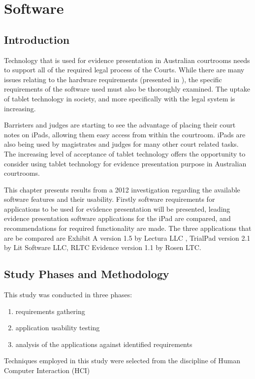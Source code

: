 


\chapter{Software\label{chap:Software}}


\section{Introduction}
\doublespace
Technology that is used for evidence presentation in Australian courtrooms needs to support all of the required legal process of the Courts. While there are many issues relating to the hardware requirements (presented in 
 ), the specific requirements of the software used must also be thoroughly examined. The uptake of tablet technology in society, and more specifically with the legal system is increasing.

Barristers and judges are starting to see the advantage of placing their court notes on iPads, allowing them easy access from within the courtroom. iPads are also being used by magistrates and judges for many other court related tasks. The increasing level of acceptance of tablet technology offers the opportunity to consider using tablet technology for evidence presentation purpose in Australian courtrooms.

This chapter presents results from a 2012 investigation regarding the available software features and their usability.
Firstly software requirements for applications to be used for evidence presentation will be presented, leading evidence presentation software applications for the iPad  are compared, and recommendations for required functionality are made.
The three applications that are be compared are Exhibit A version 1.5 by Lectura LLC ,  TrialPad version 2.1 by Lit Software LLC, RLTC Evidence version 1.1 by Rosen LTC.


\section{Study Phases and Methodology}
This study was conducted in three phases:
\begin{enumerate}
    \item requirements gathering
    \item application usability testing
    \item analysis of the applications against identified requirements
\end{enumerate} 
Techniques employed in this study were selected from the discipline of Human Computer Interaction (HCI) %
\cite{PreeceRogersSharp07}
\color{black}
